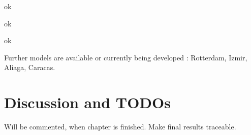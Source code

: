  \clearpage

 \clearpage

 \clearpage

 ok

 ok

 \clearpage

 ok

 \clearpage

 \clearpage

Further models are available or currently being developed \citep[][]{Axhausen_unpub_Hong_Kong_2013, MATSIM-T-Scenarios_Webpage_2014}: Rotterdam, Izmir, Aliaga, Caracas.

\section{Discussion and TODOs}
Will be commented, when chapter is finished. Make final results traceable.

%
%
%
%
%

